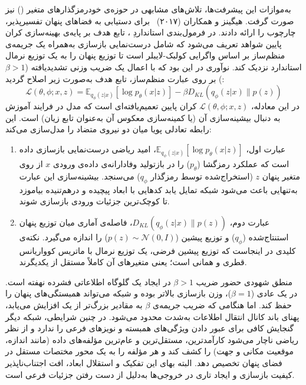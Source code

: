 به‌موازات این پیشرفت‌ها، تلاش‌های مشابهی در حوزه‌ی خودرمزگذارهای متغیر () نیز صورت گرفت. هیگینز و همکاران (۲۰۱۷)~\cite{higgins2017betavae} برای دستیابی به فضاهای پنهان تفسیرپذیر، چارچوب  را ارائه دادند. در فرمول‌بندی استانداردِ ، تابع هدف بر پایه‌ی بهینه‌سازی کران پایین شواهد تعریف می‌شود که شامل درست‌نمایی بازسازی به‌همراه یک جریمه‌ی منظم‌ساز بر اساس واگرایی کولبک-لایبلر است تا توزیع پنهان را به یک توزیع نرمال استاندارد نزدیک کند. نوآوری  در این بود که با اعمال یک ضریب وزنی تشدیدیافته ($\beta > 1$) بر روی عبارت منظم‌ساز، تابع هدف به‌صورت زیر اصلاح گردید:
\begin{equation}\label{eq:chap3_beta_vae}
    \mathcal{L}(\theta, \phi; x, z) = \mathbb{E}_{q_\phi(z|x)}[\log p_\theta(x|z)] - \beta D_{KL}(q_\phi(z|x) \parallel p(z))
\end{equation}
در این معادله، $\mathcal{L}(\theta, \phi; x, z)$ کران پایین تعمیم‌یافته‌ای است که مدل در فرایند آموزش به دنبال بیشینه‌سازی آن (یا کمینه‌سازی معکوس آن به‌عنوان تابع زیان) است. این رابطه تعادلی پویا میان دو نیروی متضاد را مدل‌سازی می‌کند:
\begin{enumerate}
    \item عبارت اول، $\mathbb{E}_{q_\phi(z|x)}[\log p_\theta(x|z)]$، امید ریاضی درست‌نمایی بازسازی داده است که عملکرد رمزگشا ($p_\theta$) را در بازتولید وفادارانه‌ی داده‌ی ورودی $x$ از روی متغیر پنهان $z$ (استخراج‌شده توسط رمزگذار $q_\phi$) می‌سنجد. بیشینه‌سازی این عبارت به‌تنهایی باعث می‌شود شبکه تمایل یابد کدهایی با ابعاد پیچیده و درهم‌تنیده بیاموزد تا کوچک‌ترین جزئیات ورودی بازسازی شوند.
    \item عبارت دوم، $D_{KL}(q_\phi(z|x) \parallel p(z))$، فاصله‌ی آماری میان توزیع پنهان استنتاج‌شده ($q_\phi$) و توزیع پیشین ($p(z) \sim \mathcal{N}(0, I)$) را اندازه می‌گیرد. نکته‌ی کلیدی در اینجاست که توزیع پیشین فرضی، یک توزیع نرمال با ماتریس کوواریانس قطری و همانی است؛ یعنی متغیرهای آن کاملاً مستقل از یکدیگرند.
\end{enumerate}

منطق شهودی حضور ضریب $\beta > 1$ در ایجاد یک گلوگاه اطلاعاتی فشرده نهفته است. در یک  عادی ($\beta = 1$)، وزن بازسازی بالاتر بوده و شبکه می‌تواند همبستگی‌های پنهان را حفظ کند. اما هنگامی که ضریب جریمه‌ی $\beta$ به مقادیر بزرگ‌تر از یک افزایش می‌یابد، پهنای باند کانال انتقال اطلاعات به‌شدت محدود می‌شود. در چنین شرایطی، شبکه دیگر گنجایش کافی برای عبور دادن ویژگی‌های همبسته و نویزهای فرعی را ندارد و از نظر ریاضی ناچار می‌شود کارآمدترین، مستقل‌ترین و عام‌ترین مؤلفه‌های داده (مانند اندازه، موقعیت مکانی و جهت) را کشف کند و هر مؤلفه را به یک محور مختصات مستقل در فضای پنهان تخصیص دهد. البته بهای این تفکیک و استقلال ابعاد، افت اجتناب‌ناپذیر کیفیت بازسازی و ایجاد تاری در خروجی‌ها به‌دلیل از دست رفتن جزئیات فرعی است.

